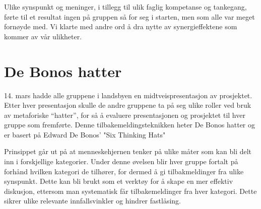 Ulike synspunkt og meninger, i tillegg til ulik faglig kompetanse og tankegang, førte til et resultat ingen på gruppen så for seg i starten, men som alle var meget fornøyde med. Vi klarte med andre ord å dra nytte av synergieffektene som kommer av vår ulikheter.



\section{De Bonos hatter} %
14. mars hadde alle gruppene i landsbyen en midtveispresentasjon av prosjektet. Etter hver presentasjon skulle de andre gruppene ta på seg ulike roller ved bruk av metaforiske “hatter”, for så å evaluere presentasjonen og prosjektet til hver gruppe som fremførte. Denne tilbakemeldingsteknikken heter De Bonos hatter og er basert på Edward De Bonos' "Six Thinking Hats" \cite{bonos}

Prinsippet går ut på at menneskehjernen tenker på ulike måter som kan bli delt inn i forskjellige kategorier. Under denne øvelsen blir hver gruppe fortalt på forhånd hvilken kategori de tilhører, for dermed å gi tilbakmeldinger fra ulike synspunkt. Dette kan bli brukt som et verktøy for å skape en mer effektiv diskusjon, ettersom man systematisk får tilbakemeldinger fra hver kategori. Dette sikrer ulike relevante innfallsvinkler og hindrer fastlåsing.

